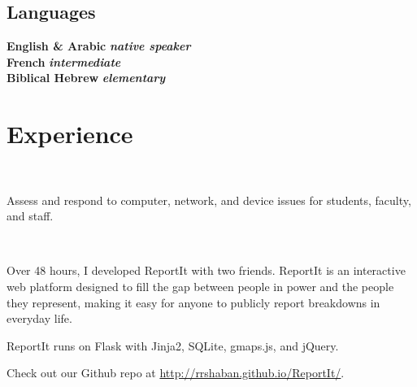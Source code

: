 \documentclass[]{deedy-resume-openfont}
\begin{document}
\begin{minipage}[t]{0.33\textwidth}
\subsection{Languages}
\textbf{English \& Arabic}   {\footnotesize \textit{\textbf{native speaker}}}\\
\textbf{French}   {\footnotesize \textit{\textbf{intermediate}}}\\
\textbf{Biblical Hebrew}   {\footnotesize \textit{\textbf{elementary}}}\\


%
%

\end{minipage} 
\hfill
\begin{minipage}[t]{0.66\textwidth} 


\section{Experience}

 \\
\vspace{\topsep} %
\begin{tightemize}
\item Assess and respond to computer, network, and device issues for students, faculty, and staff.
\end{tightemize}
\sectionsep


 \\
\begin{tightemize}
\item Over 48 hours, I developed ReportIt with two friends. ReportIt is an interactive web platform designed to fill the gap between people in power and the people they represent, making it easy for anyone to publicly report breakdowns in everyday life. 
\item ReportIt runs on Flask with Jinja2, SQLite, gmaps.js, and jQuery. 
\item Check out our Github repo at \url{http://rrshaban.github.io/ReportIt/}.
\end{tightemize}
\sectionsep



\end{minipage}
\end{document}
